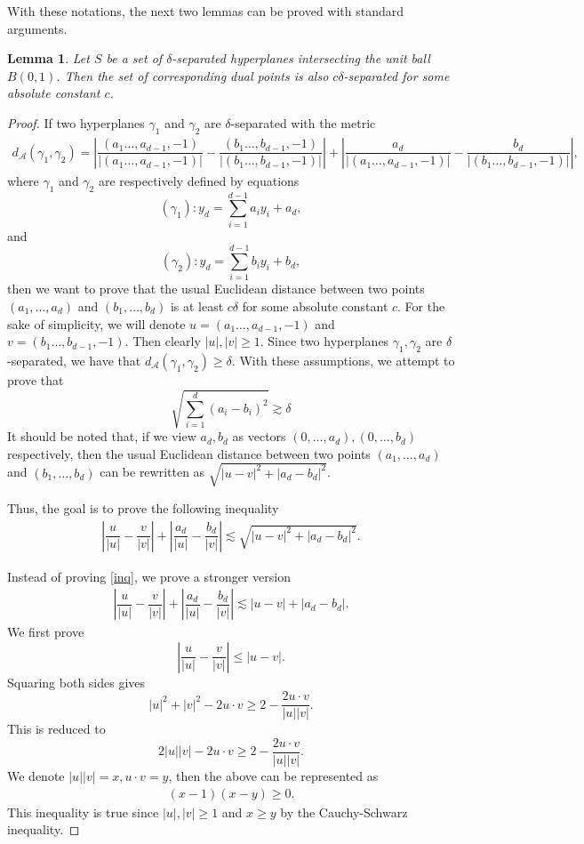 \documentclass[11pt]{article}
\newtheorem{lemma}[theorem]{Lemma}
\newcommand{\1}{\mathbf{1}}
\begin{document}
With these notations, the next two lemmas can be proved with standard arguments.
\begin{lemma}\label{lm1}
    Let $S$ be a set of $\delta$-separated hyperplanes intersecting the unit ball $B(0, 1)$. Then the set of corresponding dual points is also $c\delta$-separated for some absolute constant $c$.
\end{lemma}
\begin{proof}
    If two hyperplanes $\gamma_1$ and $\gamma_2$ are $\delta$-separated with the metric
    \begin{align*}
        d_\mathcal{A}\left(\gamma_1,\gamma_2\right) = \left|\dfrac{(a_1\ldots,a_{d-1},-1)}{\left|(a_1\ldots,a_{d-1},-1)\right|}-\dfrac{(b_1\ldots,b_{d-1},-1)}{\left|(b_1\ldots,b_{d-1},-1)\right|}\right|+\left|\dfrac{a_d}{\left|(a_1\ldots,a_{d-1},-1)\right|}-\dfrac{b_d}{\left|(b_1\ldots,b_{d-1},-1)\right|}\right|,
    \end{align*}
    where $\gamma_1$ and $\gamma_2$ are respectively defined by equations
    \[(\gamma_1): y_d=\sum_{i=1}^{d-1}a_iy_i+a_d,\]
    and
    \[(\gamma_2): y_d=\sum_{i=1}^{d-1}b_iy_i+b_d,\]
    then we want to prove that the usual Euclidean distance between two points $(a_1, \ldots, a_d)$ and $(b_1, \ldots, b_d)$ is at least $c\delta$ for some absolute constant $c$.
    For the sake of simplicity, we will denote $u=(a_1\ldots,a_{d-1},-1)$ and $v =(b_1\ldots,b_{d-1},-1) $. Then clearly $|u|,|v| \ge 1$. Since two hyperplanes $\gamma_1, \gamma_2$ are $\delta$-separated, we have that $d_\mathcal{A}\left(\gamma_1,\gamma_2\right) \ge \delta$. With these assumptions, we attempt to prove that
    \[ \sqrt{\sum_{i=1}^d (a_i-b_i)^2} \gtrsim \delta\]
    It should be noted that, if we view $a_d,b_d$ as vectors $(0,\ldots,a_d), (0,\ldots,b_d)$ respectively, then the usual Euclidean distance between two points $(a_1, \ldots, a_d)$ and $(b_1, \ldots, b_d)$ can be rewritten as $\sqrt{|u-v|^2+|a_d-b_d|^2}$.

    Thus, the goal is to prove the following inequality
    \begin{align}\label{inq}
        \left|\dfrac{u}{|u|}-\dfrac{v}{|v|}\right|+\left|\dfrac{a_d}{|u|}-\dfrac{b_d}{|v|}\right|\lesssim  \sqrt{|u-v|^2+|a_d-b_d|^2}.
    \end{align}

    Instead of proving \ref{inq}, we prove a stronger version
    \begin{align}
        \left|\dfrac{u}{|u|}-\dfrac{v}{|v|}\right|+\left|\dfrac{a_d}{|u|}-\dfrac{b_d}{|v|}\right|\lesssim |u-v| +|a_d-b_d|.
    \end{align}\label{inq1}
    We first prove
    \[\left|\dfrac{u}{|u|}-\dfrac{v}{|v|}\right| \le |u-v|. \]
    Squaring both sides gives
    \[|u|^2+|v|^2-2u\cdot v\ge 2-\dfrac{2u\cdot v}{|u||v|}.\]
    This is reduced to
    \[2|u||v|-2u\cdot v \ge 2-\dfrac{2u\cdot v}{|u||v|}.\]
    We denote $|u||v|=x, u\cdot v=y$, then the above can be represented as
    \begin{align*}
        (x-1)(x-y) \ge 0.
    \end{align*}
    This inequality is true since $|u|,|v| \ge 1$ and $x \ge y$ by the Cauchy-Schwarz inequality.


\end{proof}
\end{document}
